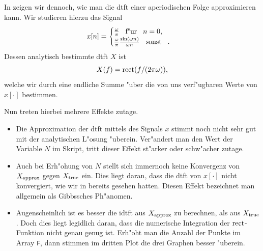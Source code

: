 In  zeigen wir dennoch, wie man die \gls{dtft} einer aperiodischen Folge approximieren kann.
Wir studieren hierzu das Signal
\[
x[n] = \begin{cases}
    \frac{\omega}{\pi} {\hspace{3mm} \text{f"ur} \hspace{3mm}} n = 0,\\
    \frac{\omega}{\pi} \frac{\sin(\omega n)}{\omega n} {\hspace{3mm} \text{sonst} \hspace{3mm}}.
\end{cases}
\]
Dessen analytisch bestimmte \gls{dtft} $X$ ist
\[
X(f) = \operatorname*{rect}(f/(2 \pi \omega)),
\]
welche wir durch eine endliche Summe "uber die von uns verf"ugbaren Werte von $x[\cdot]$ bestimmen.

Nun treten hierbei mehrere Effekte zutage.
%
\begin{itemize}
\item Die Approximation der \gls{dtft} mittels des  Signals $x$ stimmt noch nicht sehr gut mit der analytischen L"osung "uberein. 
Ver"andert man den Wert der Variable $N$ im Skript, tritt dieser Effekt st"arker oder schw"acher zutage.
\item Auch bei Erh"ohung von $N$ stellt sich immernoch keine Konvergenz von $X_{\rm approx}$ gegen $X_{\rm true}$ ein.
Dies liegt daran, dass die \gls{dtft} von $x[\cdot]$ nicht konvergiert, wie wir in  bereits gesehen hatten.
Diesen Effekt bezeichnet man allgemein als Gibbssches Ph"anomen.
\item Augenscheinlich ist es besser die \gls{idtft} aus $X_{\rm approx}$ zu berechnen, als aus $X_{\rm true}$. Doch dies liegt legidlich daran, dass die numerische Integration der $\operatorname*{rect}$-Funktion nicht genau genug ist.
Erh"oht man die Anzahl der Punkte im Array \texttt{F}, dann stimmen im dritten Plot die drei Graphen besser "uberein.
\end{itemize}
%
